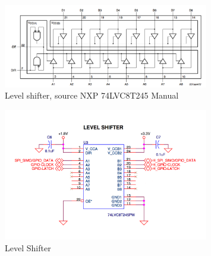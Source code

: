 \begin{figure}[H]
   \centering
   \includegraphics[width=0.8\textwidth]{img/level_Shifter.png}%
   \caption{Level shifter, source NXP  74LVC8T245 Manual}
   \label{fig:level_Shifter}%
\end{figure}

\begin{figure}[H]
   \centering
   \includegraphics[width=0.8\textwidth]{img/Levelshifter.png}%
   \caption{Level Shifter}
   \label{fig:levelShifter2}%
\end{figure}